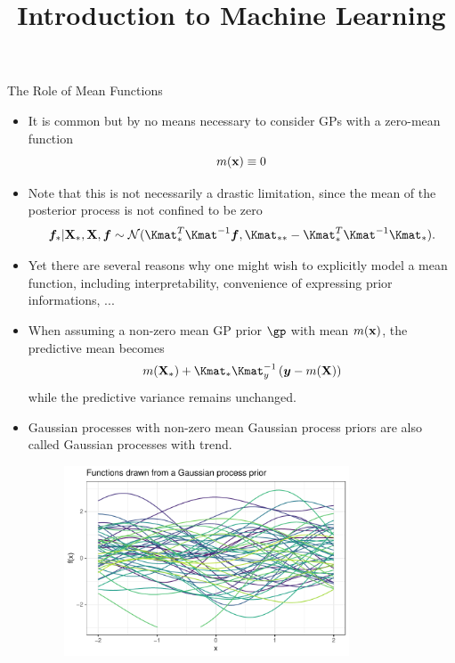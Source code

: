 \documentclass[11pt,compress,t,notes=noshow, xcolor=table]{beamer}
\title{Introduction to Machine Learning}
\date{}
\begin{document}


\begin{vbframe}{The Role of Mean Functions}

\begin{itemize}
  \item It is common but by no means necessary to consider GPs with a zero-mean function 
  $$
    m(\mathbf{x}) \equiv 0
  $$
  \item Note that this is not necessarily a drastic limitation, since the mean of the posterior process is not confined to be zero 
  $$
    \bm{f}_* | \Xmat_*, \Xmat, \bm{f} \sim \mathcal{N}(\Kmat_{*}^{T}\Kmat^{-1}\bm{f}, \Kmat_{**} - \Kmat_*^T \Kmat ^{-1}\Kmat_*).
  $$
  \item Yet there are several reasons why one might wish to explicitly model a mean function, including interpretability, convenience of expressing prior informations, ... 
  \item When assuming a non-zero mean GP prior $\gp$ with mean $m(\mathbf{x})$, the predictive mean becomes 
  $$
    m(\Xmat_*) + \Kmat_*\Kmat_y^{-1}\left(\bm{y} - m(\Xmat)\right)
  $$
  while the predictive variance remains unchanged. 
  
  \framebreak
  
  \item Gaussian processes with non-zero mean Gaussian process priors are also called Gaussian processes with trend.  
\vspace{.3cm}

\begin{figure}
\includegraphics[width=0.8\textwidth]{figure/gp_sample/1_1.pdf}
\end{figure}

\framebreak



\end{itemize}
\end{vbframe}
\end{document}
